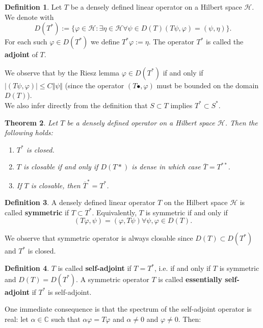 \documentclass[11pt, a4paper, german]{article}
\theoremstyle{plain}
\newtheorem{theorem}{Theorem}
\theoremstyle{definition}
\newtheorem{definition}[theorem]{Definition}
\theoremstyle{remark}
\numberwithin{equation}{section}
\numberwithin{theorem}{section}
\DeclareMathOperator{\Exists}{\exists}
\DeclareMathOperator{\Forall}{\forall}
\begin{document}
\begin{definition}
Let $T$ be a densely defined linear operator on a Hilbert space $\mathcal{H}$. We denote with $$D(T^*) := \{\varphi \in \mathcal{H} : \Exists \eta \in \mathcal{H} \Forall \psi \in D(T) (T\psi, \varphi) = (\psi, \eta) \}.$$ For each such $\varphi \in D(T^*)$ we define $T^*\varphi := \eta$. The operator $T^*$ is called the \textbf{adjoint} of $T$.
\end{definition}

We observe that by the Riesz lemma $\varphi \in D(T^*)$ if and only if $|(T\psi, \varphi)|\leq C\Vert\psi\Vert$ (since the operator $(T \bullet, \varphi)$ must be bounded on the domain $D(T)$).\\

We also infer directly from the definition that $S\subset T$ implies $T^*\subset S^*$.

\begin{theorem}
Let $T$ be a densely defined operator on a Hilbert space $\mathcal{H}$. Then the following holds:
\begin{enumerate}
\item $T^*$ is closed.
\item $T$ is closable if and only if $D(T*)$ is dense in which case $\overline T = T ^{**}$.
\item If $T$ is closable, then $\overline T ^* = T ^*$.
\end{enumerate}
\end{theorem}

\begin{definition}
A densely defined linear operator $T$ on the Hilbert space $\mathcal{H}$ is called \textbf{symmetric} if $T\subset T^*$. Equivalently, $T$ is symmetric if and only if $$(T\varphi, \psi) = (\varphi, T\psi) \Forall \psi, \varphi \in D(T).$$
\end{definition}

We observe that symmetric operator is always closable since $D(T)\subset D(T^*)$ and $T^*$ is closed.

\begin{definition}
$T$ is called \textbf{self-adjoint} if $T = T^*$, i.e. if and only if $T$ is symmetric and $D(T) = D(T^*)$. A symmetric operator $T$ is called \textbf{essentially self-adjoint} if $T^*$ is self-adjoint.
\end{definition}

One immediate consequence is that the spectrum of the self-adjoint operator is real: let $\alpha \in \mathbb C $ such that $\alpha \varphi = T \varphi$ and $\alpha \neq 0$ and $\varphi \neq 0$. Then:
\end{document}
